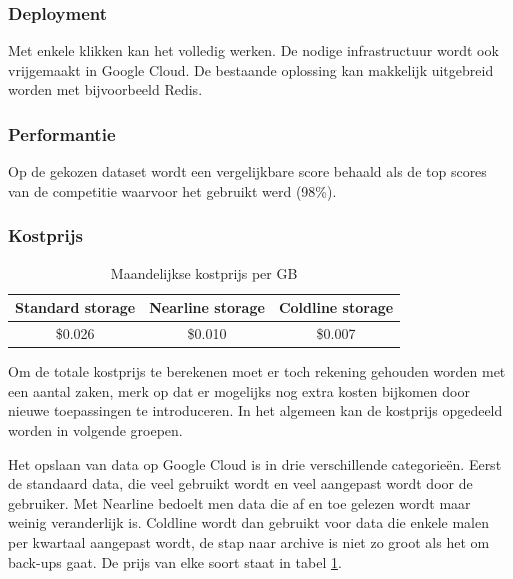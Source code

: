 \subsubsection{Deployment}
\label{sucsubsec:google-nfr-deployment}

Met enkele klikken kan het volledig werken. De nodige infrastructuur wordt ook vrijgemaakt in Google Cloud. De bestaande oplossing kan makkelijk uitgebreid worden met bijvoorbeeld Redis.

\subsubsection{Performantie}
\label{sucsubsec:google-nfr-performantie}

Op de gekozen dataset wordt een vergelijkbare score behaald als de top scores van de competitie waarvoor het gebruikt werd (98\%).

\subsubsection{Kostprijs}
\label{sucsubsec:google-nfr-price}

\begin{table}[b!]
    \centering
    \begin{tabular}{||c c c||} 
        \hline
        Standard storage & Nearline storage & Coldline storage \\ [0.5ex] 
        \hline\hline
        \$0.026 & \$0.010 & \$0.007  \\ 
        \hline
    \end{tabular}
    \caption{Maandelijkse kostprijs per GB}
    \label{table:google-storage-price}
\end{table}

Om de totale kostprijs te berekenen moet er toch rekening gehouden worden met een aantal zaken, merk op dat er mogelijks nog extra kosten bijkomen door nieuwe toepassingen te introduceren. In het algemeen kan de kostprijs opgedeeld worden in volgende groepen.

Het opslaan van data op Google Cloud is in drie verschillende categorieën. Eerst de standaard data, die veel gebruikt wordt en veel aangepast wordt door de gebruiker. Met Nearline bedoelt men data die af en toe gelezen wordt maar weinig veranderlijk is. Coldline wordt dan gebruikt voor data die enkele malen per kwartaal aangepast wordt, de stap naar archive is niet zo groot als het om back-ups gaat. De prijs van elke soort staat in tabel \ref{table:google-storage-price}.

